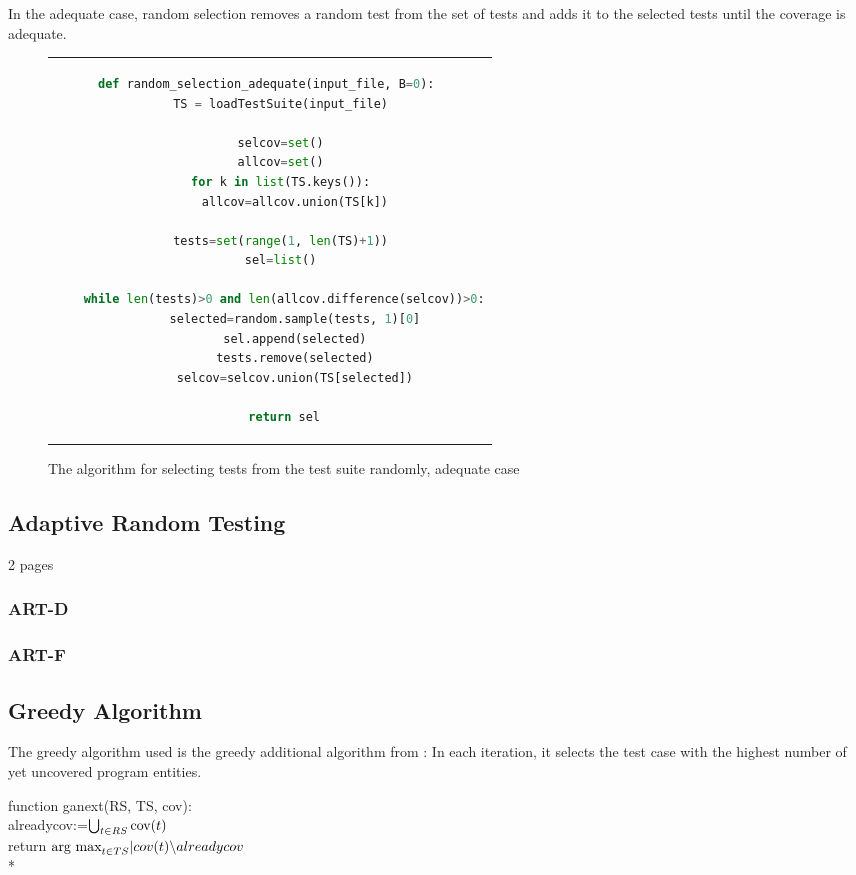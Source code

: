 In the adequate case, random selection removes a random test from the set
of tests and adds it to the selected tests until the coverage is adequate.

\begin{figure}[htpb]
\centering
\begin{tabular}{c}
\begin{lstlisting}[language=python]
def random_selection_adequate(input_file, B=0): 
	TS = loadTestSuite(input_file) 

	selcov=set() 
	allcov=set() 
	for k in list(TS.keys()): 
		allcov=allcov.union(TS[k]) 

	tests=set(range(1, len(TS)+1)) 
	sel=list() 

	while len(tests)>0 and len(allcov.difference(selcov))>0:
		selected=random.sample(tests, 1)[0] 
		sel.append(selected) 
		tests.remove(selected) 
		selcov=selcov.union(TS[selected]) 

	return sel
\end{lstlisting}
\end{tabular}
\caption[Random adequate selection]{The algorithm for selecting tests from the test suite randomly, adequate case}\label{fig:random-adequate-listing}
\end{figure}

\subsection{Adaptive Random Testing}

2 pages

\subsubsection{ART-D}

\subsubsection{ART-F}

\subsection{Greedy Algorithm}

The greedy algorithm used is the greedy additional algorithm from
\cite{rothermel2001prioritizing}: In each iteration, it selects the test
case with the highest number of yet uncovered program entities.

function ganext(RS, TS, cov): \\
	alreadycov:=$\bigcup_{t \in RS} \hbox{cov}(t)$ \\
	return $\hbox{arg max}_{t \in TS} |cov(t)\backslash alreadycov$ \\*

